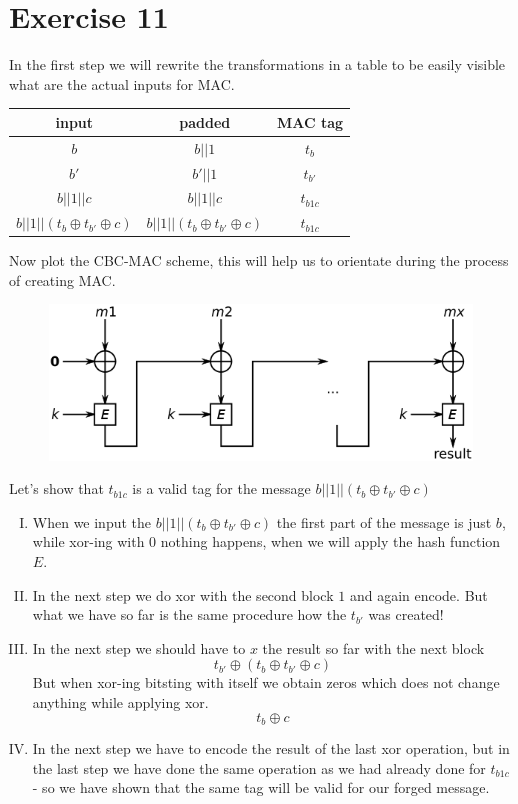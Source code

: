 \documentclass[a4paper,10pt]{article}
\begin{document}
\section*{Exercise 11}
In the first step we will rewrite the transformations in a table to be easily visible what are the actual inputs for MAC.

\begin{table}[h!]
\centering
\begin{tabular}{|c|c|c|}
\hline 
input & padded &MAC tag \\ 
\hline 
$b$ & $b||1$ & $t_b$ \\ 
\hline 
$b' $& $b'||1 $& $t_{b'} $\\ 
\hline 
$b||1||c$ & $b||1||c $& $t_{b1c}$ \\ 
\hline 
$b||1||(t_b \oplus t_{b'} \oplus c)$ & $b||1||(t_b \oplus t_{b'} \oplus c)$ & $t_{b1c}$ \\ 
\hline
\end{tabular} 
\end{table}

Now plot the CBC-MAC scheme, this will help us to orientate during the process of creating MAC.
\begin{figure}[h!]
\centering
\includegraphics[scale=0.5]{CBC-MAC.png}
\end{figure}

Let's show that $t_{b1c}$ is a valid tag for the message $b||1||(t_b \oplus t_{b'} \oplus c)$
\begin{enumerate}[I.]
\item When we input the $b||1||(t_b \oplus t_{b'} \oplus c)$ the first part of the message is just $b$, while xor-ing with 0 nothing happens, when we will apply the hash function $E$.
\item In the next step we do xor with the second block $1$ and again encode. But what we have so far is the same procedure how the $t_{b'}$ was created!
\item In the next step we should have to $x$ the result so far with the next block$$
t_{b'} \oplus (t_b \oplus t_{b'} \oplus c)
$$
But when xor-ing bitsting with itself we obtain zeros which does not change anything while applying xor.
$$
t_b \oplus c
$$
\item In the next step we have to encode the result of the last xor operation, but in the last step we have done the same operation as we had already done for $t_{b1c}$ - so we have shown that the same tag will be valid for our forged message.
\end{enumerate}
\end{document}
